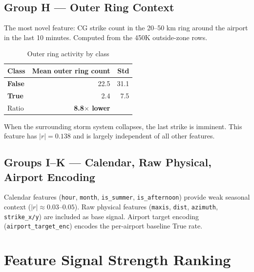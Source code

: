 \documentclass[12pt,a4paper]{article}
\begin{document}
\subsection{Group H — Outer Ring Context}

The most novel feature: CG strike count in the 20--50 km ring around the airport
in the last 10 minutes. Computed from the 450K outside-zone rows.

\begin{table}[H]
\centering
\caption{Outer ring activity by class}
\begin{tabular}{lrr}
\toprule
\textbf{Class} & \textbf{Mean outer ring count} & \textbf{Std} \\
\midrule
\textcolor{falsecolor}{\textbf{False}} & 22.5 & 31.1 \\
\textcolor{truecolor}{\textbf{True}}   & 2.4  & 7.5  \\
\midrule
Ratio & \textbf{8.8$\times$ lower} & \\
\bottomrule
\end{tabular}
\end{table}

\noindent When the surrounding storm system collapses, the last strike is imminent.
This feature has $|r|=0.138$ and is largely independent of all other features.

\subsection{Groups I--K — Calendar, Raw Physical, Airport Encoding}

Calendar features (\texttt{hour}, \texttt{month}, \texttt{is\_summer}, \texttt{is\_afternoon})
provide weak seasonal context ($|r| \approx 0.03$--$0.05$). Raw physical features
(\texttt{maxis}, \texttt{dist}, \texttt{azimuth}, \texttt{strike\_x/y}) are included
as base signal. Airport target encoding (\texttt{airport\_target\_enc}) encodes the
per-airport baseline True rate.

\section{Feature Signal Strength Ranking}
\end{document}
